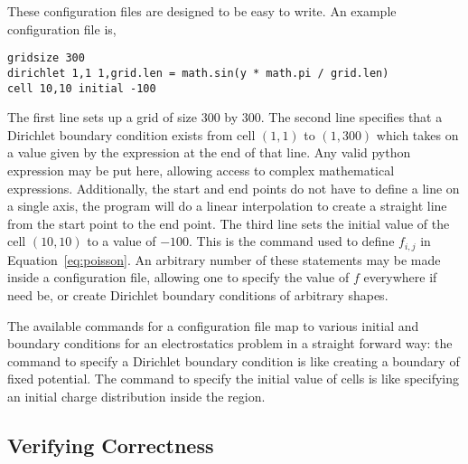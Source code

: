 These configuration files are designed to be easy to write. An example configuration file is,
\begin{addmargin}[4em]{2em}
\begin{singlespace}
\texttt{gridsize 300}\\
\texttt{dirichlet 1,1 1,grid.len = math.sin(y * math.pi / grid.len)}\\
\texttt{cell 10,10 initial -100}
\end{singlespace}
\end{addmargin}
The first line sets up a grid of size 300 by 300. The second line specifies that a Dirichlet boundary condition exists
from cell $(1, 1)$ to $(1, 300)$ which takes on a value given by the expression at the end of that line. Any valid python
expression may be put here, allowing access to complex mathematical expressions. Additionally, the start and end points
do not have to define a line on a single axis, the program will do a linear interpolation to create a straight line from
	the start point to the end point.
The third line sets the initial value of
the cell $(10, 10)$ to a value of $-100$. This is the command used to define $f_{i,j}$ in Equation~\ref{eq:poisson}.
An arbitrary number of these statements may be made inside a configuration file, allowing one to specify the value of
$f$ everywhere if need be, or create Dirichlet boundary conditions of arbitrary shapes.

The available commands for a configuration file map to various initial and boundary conditions for an electrostatics problem
in a straight forward way: the command to specify a Dirichlet boundary condition is like creating a boundary of fixed potential.
The command to specify the initial value of cells is like specifying an initial charge distribution inside the region.












\subsection{Verifying Correctness}

